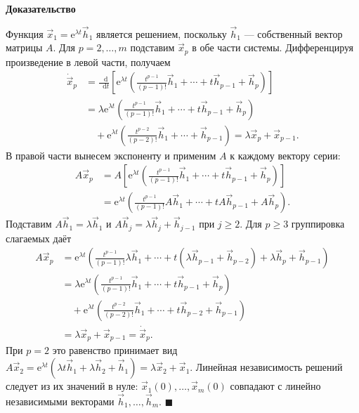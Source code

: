 \documentclass[12pt,a4paper]{article}
\numberwithin{equation}{section}
\newcommand{\vect}[1]{\vec{#1}}
\newcommand{\e}{\mathrm{e}}
\newcommand{\dd}{\mathop{}\!\mathrm{d}}
\renewenvironment{proof}[1][Доказательство]{\begin{center}\textbf{#1}\end{center}}{\hfill$\blacksquare$\par}
\begin{document}
\begin{proof}
Функция $\vect x_1=\e^{\lambda t}\vect h_1$ является решением,
поскольку $\vect h_1$ --- собственный вектор матрицы $A$.
Для $p=2,\ldots,m$ подставим $\vect x_p$ в обе части системы.
Дифференцируя произведение в левой части, получаем
\[
\begin{aligned}
 \dot{\vect x}_p
 &=\frac{\dd}{\dd t}\left[\e^{\lambda t}
 \left(\frac{t^{p-1}}{(p-1)!}\vect h_1+\cdots+t\vect h_{p-1}+\vect h_p\right)\right]\\
 &=\lambda\e^{\lambda t}
 \left(\frac{t^{p-1}}{(p-1)!}\vect h_1+\cdots+t\vect h_{p-1}+\vect h_p\right)\\
 &\quad+\e^{\lambda t}
 \left(\frac{t^{p-2}}{(p-2)!}\vect h_1+\cdots+\vect h_{p-1}\right)
 =\lambda\vect x_p+\vect x_{p-1}.
\end{aligned}
\]
В правой части вынесем экспоненту и применим $A$ к каждому вектору серии:
\[
\begin{aligned}
 A\vect x_p
 &= A\left[\e^{\lambda t}
 \left(\frac{t^{p-1}}{(p-1)!}\vect h_1+\cdots+t\vect h_{p-1}+\vect h_p\right)\right]\\
 &=\e^{\lambda t}
 \left(\frac{t^{p-1}}{(p-1)!}A\vect h_1+\cdots+tA\vect h_{p-1}+A\vect h_p\right).
\end{aligned}
\]
Подставим $A\vect h_1=\lambda\vect h_1$ и
$A\vect h_j=\lambda\vect h_j+\vect h_{j-1}$ при $j\ge2$.
Для $p\ge3$ группировка слагаемых даёт
\[
\begin{aligned}
 A\vect x_p
 &=\e^{\lambda t}\left(\frac{t^{p-1}}{(p-1)!}\lambda\vect h_1
    +\cdots+t(\lambda\vect h_{p-1}+\vect h_{p-2})
    +\lambda\vect h_p+\vect h_{p-1}\right)\\
 &=\lambda\e^{\lambda t}\left(\frac{t^{p-1}}{(p-1)!}\vect h_1
    +\cdots+t\vect h_{p-1}+\vect h_p\right)\\
 &\quad+\e^{\lambda t}\left(\frac{t^{p-2}}{(p-2)!}\vect h_1
    +\cdots+t\vect h_{p-2}+\vect h_{p-1}\right)\\
 &=\lambda\vect x_p+\vect x_{p-1}=\dot{\vect x}_p.
\end{aligned}
\]
При $p=2$ это равенство принимает вид
$A\vect x_2=\e^{\lambda t}(\lambda t\vect h_1+\lambda\vect h_2+\vect h_1)
=\lambda\vect x_2+\vect x_1$.
Линейная независимость решений следует из их значений в нуле:
$\vect x_1(0),\ldots,\vect x_m(0)$ совпадают с линейно независимыми
векторами $\vect h_1,\ldots,\vect h_m$.
\end{proof}
\end{document}
